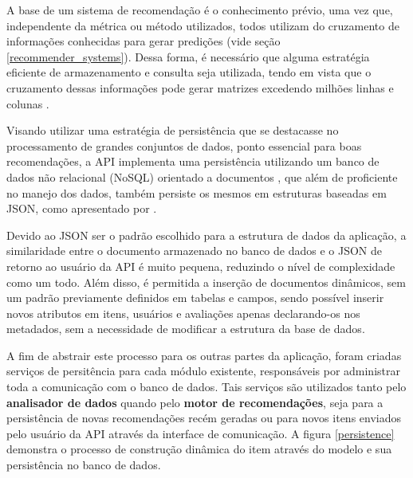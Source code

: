 \documentclass[12pt, openright, oneside, a4paper, brazil]{abntex2}
\begin{document}
A base de um sistema de recomendação é o conhecimento prévio, uma vez que, independente da métrica ou método utilizados, todos utilizam do cruzamento de informações conhecidas para gerar predições (vide seção \ref{recommender_systems}). Dessa forma, é necessário que alguma estratégia eficiente de armazenamento e consulta seja utilizada, tendo em vista que o cruzamento dessas informações pode gerar matrizes excedendo milhões linhas e colunas \cite{gomez2016netflix}.

Visando utilizar uma estratégia de persistência que se destacasse no processamento de grandes conjuntos de dados, ponto essencial para boas recomendações, a API implementa uma persistência utilizando um banco de dados não relacional (NoSQL) orientado a documentos \cite{leavitt2010will}, que além de proficiente no manejo dos dados, também persiste os mesmos em estruturas baseadas em JSON, como apresentado por .

Devido ao JSON ser o padrão escolhido para a estrutura de dados da aplicação, a similaridade entre o documento armazenado no banco de dados e o JSON de retorno ao usuário da API é muito pequena, reduzindo o nível de complexidade como um todo. Além disso, é permitida a inserção de documentos dinâmicos, sem um padrão previamente definidos em tabelas e campos, sendo possível inserir novos atributos em itens, usuários e avaliações apenas declarando-os nos metadados, sem a necessidade de modificar a estrutura da base de dados.

A fim de abstrair este processo para os outras partes da aplicação, foram criadas serviços de persitência para cada módulo existente, responsáveis por administrar toda a comunicação com o banco de dados. Tais serviços são utilizados tanto pelo \textbf{analisador de dados} quando pelo \textbf{motor de recomendações}, seja para a persistência de novas recomendações recém geradas ou para novos itens enviados pelo usuário da API através da interface de comunicação. A figura \ref{persistence} demonstra o processo de construção dinâmica do item através do modelo e sua persistência no banco de dados.
\end{document}

